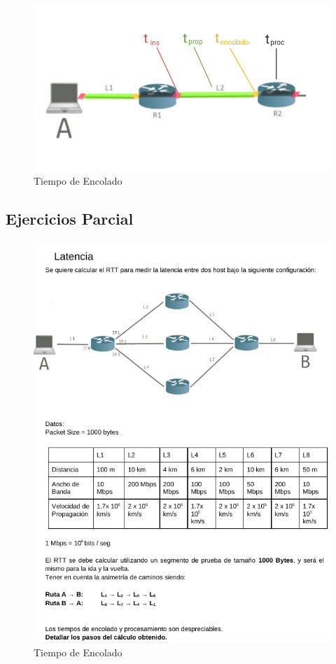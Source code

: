 \documentclass[titlepage,a4paper]{article}
\begin{document}
\begin{figure}[H]
\centering
\includegraphics[width=\textwidth]{imagenes/tiemposRTT.png}
\caption{Tiempo de Encolado}
\end{figure}


\subsection{Ejercicios Parcial}

\begin{figure}[H]
\centering
\includegraphics[width=\textwidth]{imagenes/ej1Latencia.png}
\caption{Tiempo de Encolado}
\end{figure}
\end{document}
